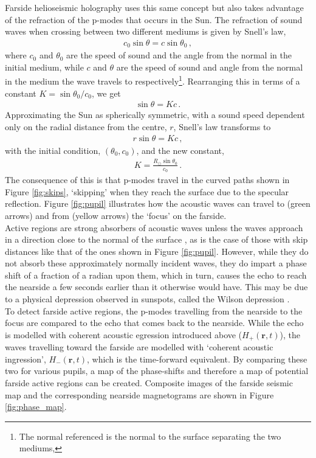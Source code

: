 \documentclass[11pt,a4paper,onecolumn]{report}
\begin{document}
Farside helioseismic holography uses this same concept but also takes advantage of
the refraction of the p-modes that occurs in the Sun. The refraction of sound
waves when crossing between two different mediums is given by Snell's law,
\begin{align}
  c_0 \sin \theta = c \sin \theta_0 \,,
\end{align}
where \(c_0\) and \(\theta_0\) are the speed of sound and the angle from the normal
in the initial medium, while \(c\) and \(\theta\) are the speed of sound and
angle from the normal in the medium the wave travels to
respectively\footnote{The normal referenced is the normal to the surface
separating the two mediums,}. Rearranging this in terms of a constant \(K = \sin
\theta_0 / c_0 \), we get
\begin{align}
  \sin \theta = Kc \,.
\end{align}
Approximating the Sun as spherically symmetric, with a sound speed dependent
only on the radial distance from the centre, \(r\), Snell's law transforms to
\begin{align}
  r\sin \theta = Kc \,,
\end{align}
with the initial condition, \((\theta_0, c_0)\), and the new constant,
\begin{align}
  K = \frac{R_\odot \sin \theta_0}{c_0}\,.
\end{align}
The consequence of this is that p-modes travel in the curved paths shown in
Figure \ref{fig:skips}, `skipping' when they reach the surface due to the
specular reflection. Figure \ref{fig:pupil} illustrates how the acoustic waves
can travel to (green arrows) and from (yellow arrows) the `focus' on the
farside. \\

Active regions are strong absorbers of acoustic waves unless the waves approach
in a direction close to the normal of the surface \citep{Braun1989,
lindsey_seismic_2000, braun_surface-focused_2008}, as is the case of those with
skip distances like that of the ones shown in Figure \ref{fig:pupil}. However,
while they do not absorb these approximately normally incident waves, they do
impart a phase shift of a fraction of a radian upon them, which in turn, causes
the echo to reach the nearside a few seconds earlier than it otherwise would
have. This may be due to a physical depression observed in sunspots, called
the Wilson depression \citep{Lindsey_2010}.\\

To detect farside active regions, the p-modes travelling
from the nearside to the focus are compared to the echo that comes back to the
nearside. While the echo is modelled with coherent acoustic egression introduced
above (\(H_+(\bm{r}, t)\)), the waves travelling toward the farside are modelled with
`coherent acoustic ingression', \(H_-(\bm{r}, t)\), which is the time-forward
equivalent. By comparing these two for various pupils, a map of the phase-shifts
and therefore a map of potential farside active regions can be created.
Composite images of the farside seismic map and the corresponding nearside
magnetograms are shown in Figure \ref{fig:phase_map}.\\
\end{document}
